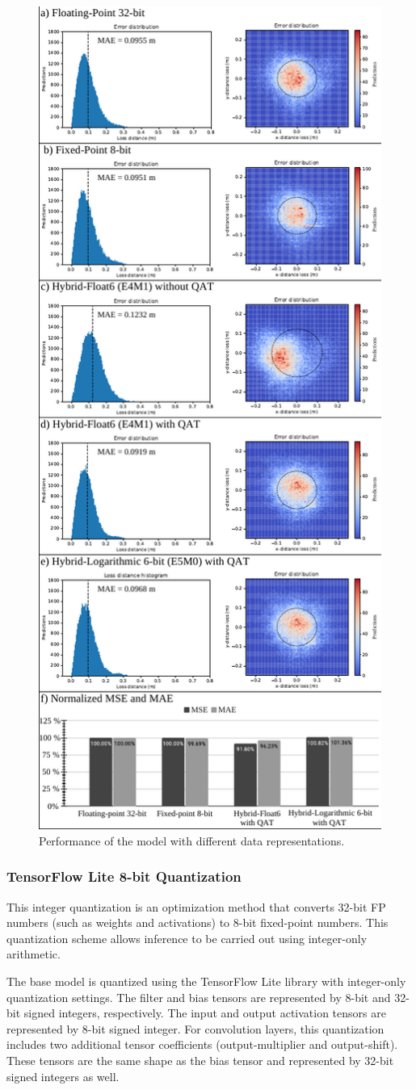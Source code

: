\begin{figure}[b!]
	\centering
	\includegraphics[width=0.5\columnwidth]{./chapters/cnn_accelerator/figures/histograms/model_evaluation.pdf}
	\caption{Performance of the model with different data representations.}
	\label{fig:model_evaluation}
\end{figure}

\subsubsection{TensorFlow Lite 8-bit Quantization}
This integer quantization is an optimization method that converts 32-bit FP numbers (such as weights and activations) to 8-bit fixed-point numbers. This quantization scheme allows inference to be carried out using integer-only arithmetic\cite{hannwindowsine}.

The base model is quantized using the TensorFlow Lite library with integer-only quantization settings. The filter and bias tensors are represented by 8-bit and 32-bit signed integers, respectively. The input and output activation tensors are represented by 8-bit signed integer. For convolution layers, this quantization includes two additional tensor coefficients (output-multiplier and output-shift). These tensors are the same shape as the bias tensor and represented by 32-bit signed integers as well.


